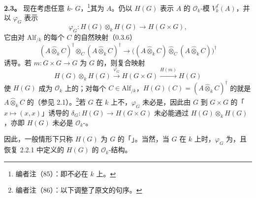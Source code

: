 \textbf{2.3。} 现在考虑任意 $k$- $G$，\footnote{编者注（85）：即不必在 $k$ 上。}其为 $A$。仍以 $H(G)$ 表示 $A$ 的 $\mathscr O_k$-模 $V_k^f(A)$，并以 $\varphi_G$ 表示
\[
\varphi_G:H(G)\otimes_k H(G)\longrightarrow H(G\times G),
\]
它由对 $\mathrm{Alf}_{/k}$ 的每个 $C$ 的自然映射（0.3.6）
\[
(A\widehat\otimes_k C)^\dagger\otimes_C(A\widehat\otimes_k C)^\dagger\longrightarrow
\bigl((A\widehat\otimes_k C)\widehat\otimes_C(A\widehat\otimes_k C)\bigr)^\dagger
\]
诱导。若 $m:G\times G\to G$ 为 $G$ 的，则复合映射
\[
H(G)\otimes_k H(G)\xrightarrow{\varphi_G}H(G\times G)\xrightarrow{H(m)}H(G)
\]
使 $H(G)$ 成为 $\mathscr O_k$ 上的；对每个 $C\in\mathrm{Alf}_{/k}$，$H(G)(C)=(A\widehat\otimes_k C)^\dagger$ 的就是 $A\widehat\otimes_k C$ 的（参见 2.1）。\footnote{编者注（86）：以下调整了原文的句序。}若 $G$ 在 $k$ 上不，$\varphi_G$ 未必是，因此由 $G$ 到 $G\times G$ 的「$x\mapsto(x,x)$」诱导的 $\delta_G:H(G)\to H(G\times G)$ 未必能通过 $H(G)\otimes_k H(G)$ ，亦即 $H(G)$ 未必是 $\mathscr O_k$-。

因此，一般情形下只称 $H(G)$ 为 $G$ 的「」。当然，当 $G$ 在 $k$ 上时，$\varphi_G$ 为，且恢复 2.2.1 中定义的 $H(G)$ 的 $\mathscr O_k$-结构。

